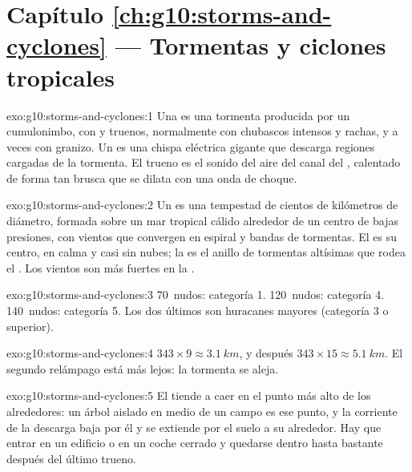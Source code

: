 \section*{Capítulo \ref{ch:g10:storms-and-cyclones} --- Tormentas y ciclones tropicales}

\begin{solution}{exo:g10:storms-and-cyclones:1}
Una  es una tormenta producida por un cumulonimbo, con
 y truenos, normalmente con chubascos intensos y rachas, y a veces con
granizo. Un  es una chispa eléctrica gigante que descarga regiones
cargadas de la tormenta. El trueno es el sonido del aire del canal del ,
calentado de forma tan brusca que se dilata con una onda de choque.
\end{solution}

\begin{solution}{exo:g10:storms-and-cyclones:2}
Un  es una tempestad de cientos de kilómetros de diámetro,
formada sobre un mar tropical cálido alrededor de un centro de bajas
presiones, con vientos que convergen en espiral y bandas de tormentas. El 
es su centro, en calma y casi sin nubes; la  es el anillo de
tormentas altísimas que rodea el . Los vientos son más fuertes en la
.
\end{solution}

\begin{solution}{exo:g10:storms-and-cyclones:3}
\num{70}~nudos: categoría 1. \num{120}~nudos: categoría 4.
\num{140}~nudos: categoría 5. Los dos últimos son huracanes mayores
(categoría 3 o superior).
\end{solution}

\begin{solution}{exo:g10:storms-and-cyclones:4}
$343 \times 9 \approx \qty{3.1}{km}$, y después $343 \times 15 \approx
\qty{5.1}{km}$. El segundo relámpago está más lejos: la tormenta se aleja.
\end{solution}

\begin{solution}{exo:g10:storms-and-cyclones:5}
El  tiende a caer en el punto más alto de los alrededores: un árbol
aislado en medio de un campo es ese punto, y la corriente de la descarga
baja por él y se extiende por el suelo a su alrededor. Hay que entrar en un
edificio o en un coche cerrado y quedarse dentro hasta bastante después del
último trueno.
\end{solution}

